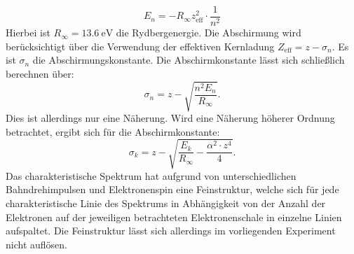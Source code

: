 \begin{equation}
  \label{eqn:blubba}
  E_n=-R_\infty z_\mathrm{eff}^2 \cdot \frac{1}{n^2}
\end{equation}
Hierbei ist $R_\infty=\SI{13.6}{\electronvolt}$ die Rydbergenergie. Die Abschirmung wird berücksichtigt über die Verwendung der effektiven Kernladung $Z_\mathrm{eff}=z-\sigma_n$. Es ist $\sigma_n$ die Abschirmungskonstante.
Die Abschirmkonstante lässt sich schließlich berechnen über:
\begin{equation}
  \sigma_n=z-\sqrt{\frac{n^2 E_n}{R_\infty}} \text{.}
\end{equation}
Dies ist allerdings nur eine Näherung. Wird eine Näherung höherer Ordnung betrachtet, ergibt sich für die Abschirmkonstante:
\begin{equation}
  \label{eqn:schirm}
  \sigma_k=z-\sqrt{\frac{E_k}{R_\infty}-\frac{\alpha^2\cdot z^4}{4}} \text{.}
\end{equation}
Das charakteristische Spektrum hat aufgrund von unterschiedlichen Bahndrehimpulsen und Elektronenspin eine Feinstruktur, welche sich für jede charakteristische Linie des Spektrums in Abhängigkeit von der Anzahl der Elektronen auf der jeweiligen betrachteten Elektronenschale in einzelne Linien aufspaltet.
Die Feinstruktur lässt sich allerdings im vorliegenden Experiment nicht auflösen.

